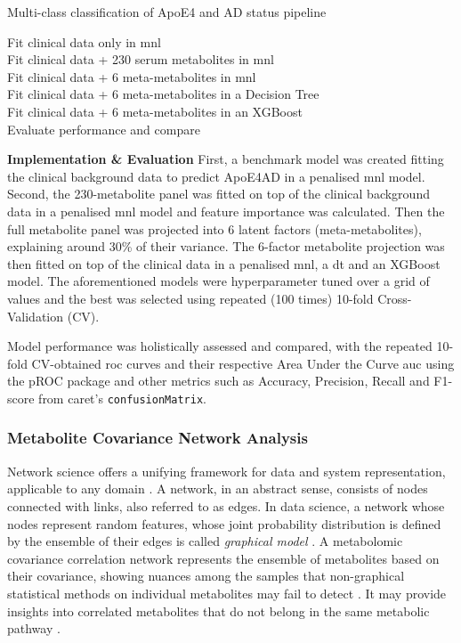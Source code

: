 \documentclass{amsart}
\begin{document}
\begin{algorithm}
\caption{Multi-class classification of ApoE4 and AD status pipeline} \label{alg:classification}
    Fit clinical data only in \acrlong{mnl}\\
    Fit clinical data + 230 serum metabolites in \acrlong{mnl}\\
    Fit clinical data + 6 meta-metabolites in \acrlong{mnl}\\
    Fit clinical data + 6 meta-metabolites in a Decision Tree\\
    Fit clinical data + 6 meta-metabolites in an XGBoost\\
    Evaluate performance and compare
\end{algorithm}

\leavevmode\newline \textbf{Implementation \& Evaluation}\hspace{.25cm} First, a benchmark model was created fitting the clinical background data to predict ApoE4AD in a penalised \acrlong{mnl} model. Second, the 230-metabolite panel was fitted on top of the clinical background data in a penalised \acrlong{mnl} model and feature importance was calculated. Then the full metabolite panel was projected into 6 latent factors (meta-metabolites), explaining around 30\% of their variance. The 6-factor metabolite projection was then fitted on top of the clinical data in a penalised \acrlong{mnl}, a \acrlong{dt} and an XGBoost model. The aforementioned models were hyperparameter tuned over a grid of values and the best was selected using repeated (100 times) 10-fold Cross-Validation (CV). 

Model performance was holistically assessed and compared, with the repeated 10-fold CV-obtained \acrfull{roc} curves and their respective Area Under the Curve \acrshort{auc} using the \textsf{pROC} package \cite{pROC} and other metrics such as Accuracy, Precision, Recall and F1-score from \textsf{caret}'s \texttt{confusionMatrix}.

\subsubsection{Metabolite Covariance Network Analysis}\label{rq3}
Network science offers a unifying framework for data and system representation, applicable to any domain \cite{Barabasi2015NetworkScience}. A network, in an abstract sense, consists of nodes connected with links, also referred to as edges. In data science, a network whose nodes represent random features, whose joint probability distribution is defined by the ensemble of their edges is called \textit{graphical model} \cite{Peeters2022Rags2ridges:Matrices}. A metabolomic covariance correlation network represents the ensemble of metabolites based on their covariance, showing nuances among the samples that non-graphical statistical methods on individual metabolites may fail to detect \cite{PerezDeSouza2020Network-basedInterpretation}. It may provide insights into correlated metabolites that do not belong in the same metabolic pathway \cite{PerezDeSouza2020Network-basedInterpretation}.
\end{document}
